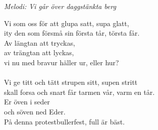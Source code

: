 {\footnotesize\textit{Melodi: Vi går över daggstänkta berg}}\par
\vspace{10pt}
Vi som oss för att glupa satt, supa glatt,\\
ity den som försmå sin första tår, törsta får.\\
Av längtan att tryckas,\\
av trängtan att lyckas,\\
vi nu med bravur häller ur, eller hur?\\
\\
Vi ge titt och tätt strupen sitt, supen stritt\\
skall forsa och snart får tarmen vår, varm en tår.\\
Er öven i seder\\
och söven ned Eder.\\
På denna protestbullerfest, full är bäst.
